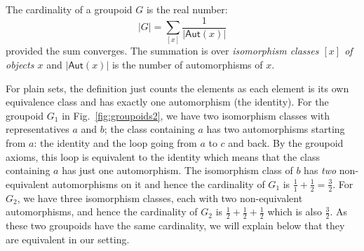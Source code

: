 \begin{definition}
  The cardinality of a groupoid $G$ is the real number:
  \[
    |G| = \sum_{[x]} \frac{1}{|\textsf{Aut}(x)|}
  \]
  provided the sum converges. The summation is over \emph{isomorphism
    classes $[x]$ of objects $x$} and $|\textsf{Aut}(x)|$ is the
  number of automorphisms of $x$.
\end{definition}

For plain sets, the definition just counts the elements as each
element is its own equivalence class and has exactly one automorphism
(the identity). For the groupoid $G_1$ in Fig.~\ref{fig:groupoids2},
we have two isomorphism classes with representatives $a$ and $b$; the
class containing $a$ has two automorphisms starting from $a$: the
identity and the loop going from $a$ to $c$ and back. By the groupoid
axioms, this loop is equivalent to the identity which means that the
class containing $a$ has just one automorphism. The isomorphism class
of $b$ has \emph{two} non-equivalent automorphisms on it and hence the
cardinality of $G_1$ is $\frac{1}{1} + \frac{1}{2} = \frac{3}{2}$. For
$G_2$, we have three isomorphism classes, each with two non-equivalent
automorphisms, and hence the cardinality of $G_2$ is $\frac{1}{2}
+ \frac{1}{2} + \frac{1}{2}$ which is also $\frac{3}{2}$. As these two
groupoids have the same cardinality, we will explain below that they
are equivalent in our setting. 

